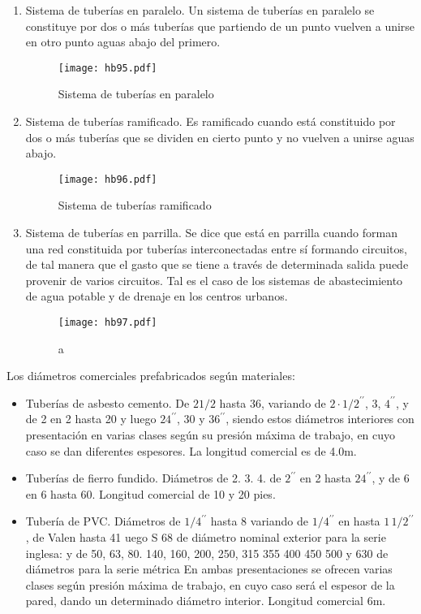 \begin{enumerate}
    \item Sistema de tuberías en paralelo. Un sistema de tuberías en paralelo se constituye por dos o más tuberías que partiendo de un punto vuelven a unirse en otro punto aguas abajo del primero.
    \begin{figure}[h!]
    \centering
      \texttt{[image: hb95.pdf]}
      \caption{Sistema de tuberías en paralelo}
      \label{hb95}
    \end{figure}
    \item Sistema de tuberías ramificado. Es ramificado cuando está constituido por dos o más tuberías que se dividen en cierto punto y no vuelven a unirse aguas abajo.
    \begin{figure}[h!]
    \centering
      \texttt{[image: hb96.pdf]}
      \caption{Sistema de tuberías ramificado}
      \label{hb96}
    \end{figure}
    \item Sistema de tuberías en parrilla. Se dice que está en parrilla cuando forman una red constituida por tuberías interconectadas entre sí formando circuitos, de tal manera que el gasto que se tiene a través de determinada salida puede provenir de varios circuitos. Tal es el caso de los sistemas de abastecimiento de agua potable y de drenaje en los centros urbanos.
    \begin{figure}[h!]
    \centering
      \texttt{[image: hb97.pdf]}
      \caption{a}
      \label{hb97}
    \end{figure}
\end{enumerate}

Los diámetros comerciales prefabricados según materiales:
\begin{itemize}
    \item Tuberías de asbesto cemento. De $2 1/2$ hasta 36, variando de $2\cdot  1/2^{\prime\prime}$, 3, $4^{\prime\prime}$, y de 2 en 2 hasta 20 y luego $24^{\prime\prime}$, 30 y $36^{\prime\prime}$, siendo estos diámetros interiores con presentación en varias clases según su presión máxima de trabajo, en cuyo caso se dan diferentes espesores. La longitud comercial es de 4.0m.
    \item Tuberías de fierro fundido. Diámetros de 2. 3. 4. de $2^{\prime\prime}$ en 2 hasta $24^{\prime\prime}$, y de 6 en 6 hasta 60. Longitud comercial de 10 y 20 pies.
    \item Tubería de PVC. Diámetros de $1/4^{\prime\prime}$ hasta 8 variando de $1/4^{\prime\prime}$ en hasta $1\, 1/2^{\prime\prime}$, de Valen hasta 41 uego S 68 de diámetro nominal exterior para la serie inglesa: y de 50, 63, 80. 140, 160, 200, 250, 315 355 400 450 500 y 630 de diámetros para la serie métrica En ambas presentaciones se ofrecen varias clases según presión máxima de trabajo, en cuyo caso será el espesor de la pared, dando un determinado diámetro interior. Longitud comercial 6m.
\end{itemize}

